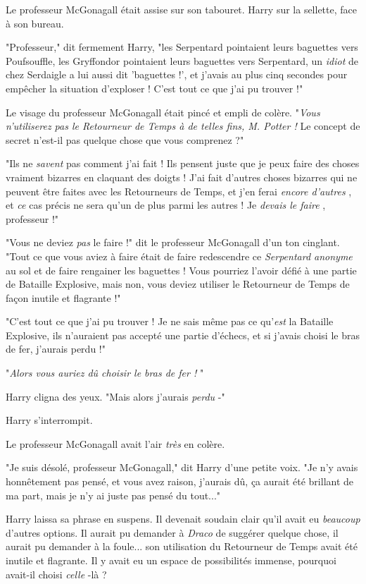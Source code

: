Le professeur McGonagall était assise sur son tabouret. Harry sur la sellette, face à son bureau.

"Professeur," dit fermement Harry, "les Serpentard pointaient leurs baguettes vers Poufsouffle, les Gryffondor pointaient leurs baguettes vers Serpentard, un \emph{idiot}  de chez Serdaigle a lui aussi dit 'baguettes !', et j'avais au plus cinq secondes pour empêcher la situation d'exploser ! C'est tout ce que j'ai pu trouver !"

Le visage du professeur McGonagall était pincé et empli de colère. "\emph{Vous n'utiliserez pas le Retourneur de Temps à de telles fins, M. Potter ! } Le concept de secret n'est-il pas quelque chose que vous comprenez ?"

"Ils ne \emph{savent}  pas comment j'ai fait ! Ils pensent juste que je peux faire des choses vraiment bizarres en claquant des doigts ! J'ai fait d'autres choses bizarres qui ne peuvent être faites avec les Retourneurs de Temps, et j'en ferai \emph{encore d'autres} , et \emph{ce } cas précis ne sera qu'un de plus parmi les autres ! Je \emph{devais le faire} , professeur !"

"Vous ne deviez \emph{pas}  le faire !" dit le professeur McGonagall d'un ton cinglant. "Tout ce que vous aviez à faire était de faire redescendre ce \emph{Serpentard anonyme}  au sol et de faire rengainer les baguettes ! Vous pourriez l'avoir défié à une partie de Bataille Explosive, mais non, vous deviez utiliser le Retourneur de Temps de façon inutile et flagrante !"

"C'est tout ce que j'ai pu trouver ! Je ne sais même pas ce qu'\emph{est}  la Bataille Explosive, ils n'auraient pas accepté une partie d'échecs, et si j'avais choisi le bras de fer, j'aurais perdu !"

"\emph{Alors vous auriez dû choisir le bras de fer !} "

Harry cligna des yeux. "Mais alors j'aurais \emph{perdu}  -"

Harry s'interrompit.

Le professeur McGonagall avait l'air \emph{très}  en colère.

"Je suis désolé, professeur McGonagall," dit Harry d'une petite voix. "Je n'y avais honnêtement pas pensé, et vous avez raison, j'aurais dû, ça aurait été brillant de ma part, mais je n'y ai juste pas pensé du tout..."

Harry laissa sa phrase en suspens. Il devenait soudain clair qu'il avait eu \emph{beaucoup}  d'autres options. Il aurait pu demander à \emph{Draco}  de suggérer quelque chose, il aurait pu demander à la foule... son utilisation du Retourneur de Temps avait été inutile et flagrante. Il y avait eu un espace de possibilités immense, pourquoi avait-il choisi \emph{celle} -là ?

